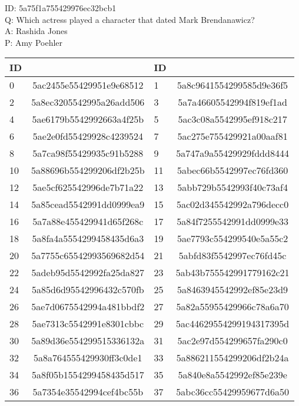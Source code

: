 \documentclass[11pt,a4paper]{article}
\begin{document}
\noindent ID: 5a75f1a755429976ec32bcb1 \\
\noindent Q: Which actress played a character that dated Mark Brendanawicz? \\
\noindent A: Rashida Jones \\
\noindent P: Amy Poehler \\



\begin{table*}[t!]
    \centering
    \begin{tabular}{lclc}
    ID &  & ID  &  \\ \hline
    0 & 5ac2455e55429951e9e68512 & 1 & 5a8c9641554299585d9e36f5 \\
2 & 5a8ec3205542995a26add506 & 3 & 5a7a46605542994f819ef1ad \\
4 & 5ae6179b5542992663a4f25b & 5 & 5ac3c08a5542995ef918c217 \\
6 & 5ae2e0fd55429928c4239524 & 7 & 5ac275e755429921a00aaf81 \\
8 & 5a7ca98f55429935c91b5288 & 9 & 5a747a9a55429929fddd8444 \\
10 & 5a88696b554299206df2b25b & 11 & 5abec66b5542997ec76fd360 \\
12 & 5ae5cf625542996de7b71a22 & 13 & 5abb729b5542993f40c73af4 \\
14 & 5a85cead5542991dd0999ea9 & 15 & 5ac02d345542992a796decc0 \\
16 & 5a7a88e455429941d65f268c & 17 & 5a84f7255542991dd0999e33 \\
18 & 5a8fa4a5554299458435d6a3 & 19 & 5ae7793c554299540e5a55c2 \\
20 & 5a7755c65542993569682d54 & 21 & 5abfd83f5542997ec76fd45c \\
22 & 5adeb95d5542992fa25da827 & 23 & 5ab43b755542991779162c21 \\
24 & 5a85d6d95542996432c570fb & 25 & 5a8463945542992ef85e23d9 \\
26 & 5ae7d0675542994a481bbdf2 & 27 & 5a82a55955429966c78a6a70 \\
28 & 5ae7313c5542991e8301cbbc & 29 & 5ac44629554299194317395d \\
30 & 5a89d36e554299515336132a & 31 & 5ac2e97d554299657fa290c0 \\
32 & 5a8a764555429930ff3c0de1 & 33 & 5a886211554299206df2b24a \\
34 & 5a8f05b1554299458435d517 & 35 & 5a840e8a5542992ef85e239e \\
36 & 5a7354e35542994cef4bc55b & 37 & 5abc36cc55429959677d6a50 \\

\end{tabular}
\end{table*}
\end{document}
